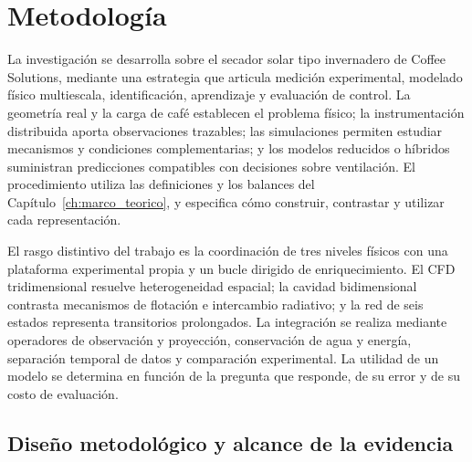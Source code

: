 
\clearpage
\chapter{Metodología}
\label{ch:metodologia}

La investigación se desarrolla sobre el secador solar tipo invernadero de Coffee Solutions, mediante una estrategia que articula medición experimental, modelado físico multiescala, identificación, aprendizaje y evaluación de control. La geometría real y la carga de café establecen el problema físico; la instrumentación distribuida aporta observaciones trazables; las simulaciones permiten estudiar mecanismos y condiciones complementarias; y los modelos reducidos o híbridos suministran predicciones compatibles con decisiones sobre ventilación. El procedimiento utiliza las definiciones y los balances del Capítulo~\ref{ch:marco_teorico}, y especifica cómo construir, contrastar y utilizar cada representación.

El rasgo distintivo del trabajo es la coordinación de tres niveles físicos con una plataforma experimental propia y un bucle dirigido de enriquecimiento. El CFD tridimensional resuelve heterogeneidad espacial; la cavidad bidimensional contrasta mecanismos de flotación e intercambio radiativo; y la red de seis estados representa transitorios prolongados. La integración se realiza mediante operadores de observación y proyección, conservación de agua y energía, separación temporal de datos y comparación experimental. La utilidad de un modelo se determina en función de la pregunta que responde, de su error y de su costo de evaluación.

\section{Diseño metodológico y alcance de la evidencia}
\label{met:diseno}

